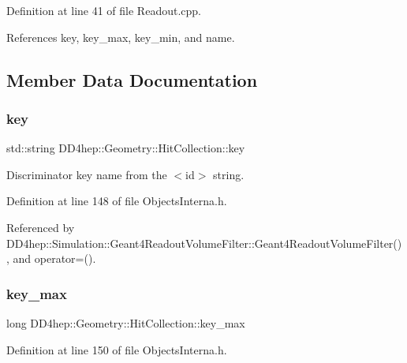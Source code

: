 Definition at line 41 of file Readout.\+cpp.



References key, key\+\_\+max, key\+\_\+min, and name.



\subsection{Member Data Documentation}
\hypertarget{class_d_d4hep_1_1_geometry_1_1_hit_collection_a4948f37ecd677f966101a2d662412790}{}\label{class_d_d4hep_1_1_geometry_1_1_hit_collection_a4948f37ecd677f966101a2d662412790} 
\subsubsection{\texorpdfstring{key}{key}}
{\footnotesize\ttfamily std\+::string D\+D4hep\+::\+Geometry\+::\+Hit\+Collection\+::key}



Discriminator key name from the $<$id$>$ string. 



Definition at line 148 of file Objects\+Interna.\+h.



Referenced by D\+D4hep\+::\+Simulation\+::\+Geant4\+Readout\+Volume\+Filter\+::\+Geant4\+Readout\+Volume\+Filter(), and operator=().

\hypertarget{class_d_d4hep_1_1_geometry_1_1_hit_collection_af307fe48c5092b585933c02e837f177d}{}\label{class_d_d4hep_1_1_geometry_1_1_hit_collection_af307fe48c5092b585933c02e837f177d} 
\subsubsection{\texorpdfstring{key\+\_\+max}{key\_max}}
{\footnotesize\ttfamily long D\+D4hep\+::\+Geometry\+::\+Hit\+Collection\+::key\+\_\+max}



Definition at line 150 of file Objects\+Interna.\+h.



